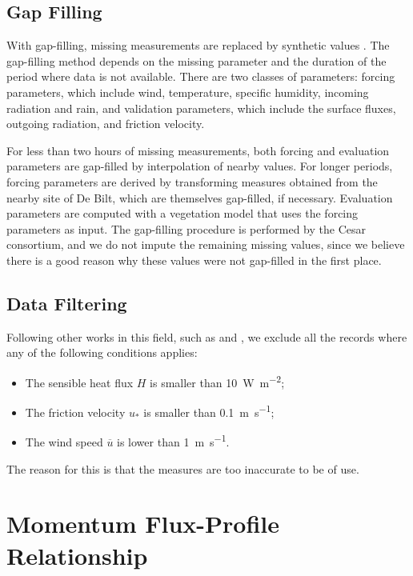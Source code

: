 \documentclass[a4paper]{book}
\begin{document}
\subsection{Gap Filling}
\label{sec:gap_filling}
With gap-filling, missing measurements are replaced by synthetic values \citep{cabauw_gapfilling}. The gap-filling method depends on the missing parameter and the duration of the period where data is not available. There are two classes of parameters: forcing parameters, which include wind, temperature, specific humidity, incoming radiation and rain, and validation parameters, which include the surface fluxes, outgoing radiation, and friction velocity.

For less than two hours of missing measurements, both forcing and evaluation parameters are gap-filled by interpolation of nearby values. For longer periods, forcing parameters are derived by transforming measures obtained from the nearby site of De Bilt, which are themselves gap-filled, if necessary. Evaluation parameters are computed with a vegetation model that uses the forcing parameters as input. The gap-filling procedure is performed by the Cesar consortium, and we do not impute the remaining missing values, since we believe there is a good reason why these values were not gap-filled in the first place.

\subsection{Data Filtering}
\label{sec:data_filter}
Following other works in this field, such as \cite{boulder} and \cite{hogstrom88}, we exclude all the records where any of the following conditions applies:

\begin{itemize}
\item The sensible heat flux $H$ is smaller than \SI{10}{\watt\per\square\meter};
\item The friction velocity $u_*$ is smaller than \SI{0.1}{\meter\per\second};
\item The wind speed $\overline{u}$ is lower than \SI{1}{\meter\per\second}.
\end{itemize}

The reason for this is that the measures are too inaccurate to be of use.


\section{Momentum Flux-Profile Relationship}
\label{sec:profiles}
\end{document}
